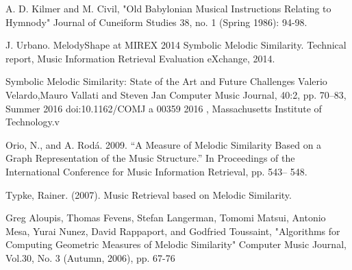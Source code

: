 \documentclass{llncs}
\begin{document}
	\begin{thebibliography}{5}
	
	A. D. Kilmer and M. Civil, 
	"Old Babylonian Musical Instructions Relating to Hymnody" 
	Journal of Cuneiform Studies 38, 
	no. 1 (Spring 1986): 94-98.

	J. Urbano. MelodyShape at 
	MIREX 2014 Symbolic Melodic Similarity. 
	Technical report, Music Information Retrieval Evaluation eXchange, 2014.

	Symbolic Melodic Similarity: State of the Art and Future Challenges
	Valerio Velardo,Mauro Vallati and Steven Jan
	Computer Music Journal, 40:2, pp. 70–83, Summer 2016 doi:10.1162/COMJ a 00359
	2016 , Massachusetts Institute of Technology.v

	 Orio, N., and A. Rodá. 2009. “A Measure of Melodic Similarity Based on a Graph Representation of the Music Structure.” In Proceedings of the International Conference for Music Information Retrieval, pp. 543– 548.

	 Typke, Rainer. (2007). Music Retrieval based on Melodic Similarity.

	 Greg Aloupis, Thomas Fevens, Stefan Langerman, Tomomi Matsui, Antonio Mesa, Yurai Nunez, David Rappaport, and Godfried Toussaint, "Algorithms for Computing Geometric Measures of Melodic Similarity" Computer Music Journal, Vol.30, No. 3 (Autumn, 2006), pp. 67-76

	\end{thebibliography}

	
\end{document}
